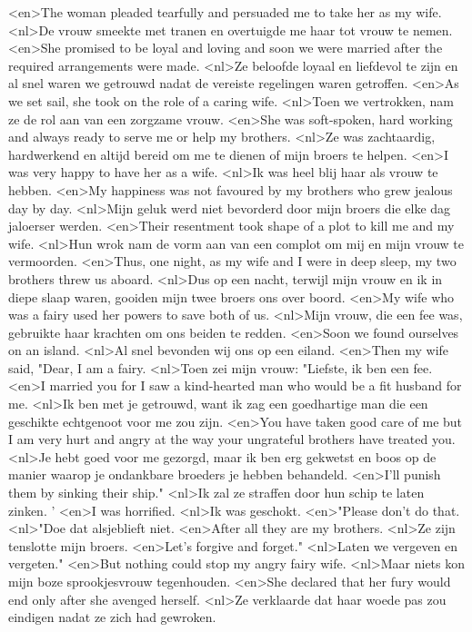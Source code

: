 <en>The woman pleaded tearfully and persuaded me to take her as my wife.
<nl>De vrouw smeekte met tranen en overtuigde me haar tot vrouw te nemen.
<en>She promised to be loyal and loving and soon we were married after the required arrangements were made.
<nl>Ze beloofde loyaal en liefdevol te zijn en al snel waren we getrouwd nadat de vereiste regelingen waren getroffen.
<en>As we set sail, she took on the role of a caring wife.
<nl>Toen we vertrokken, nam ze de rol aan van een zorgzame vrouw.
<en>She was soft-spoken, hard working and always ready to serve me or help my brothers.
<nl>Ze was zachtaardig, hardwerkend en altijd bereid om me te dienen of mijn broers te helpen.
<en>I was very happy to have her as a wife.
<nl>Ik was heel blij haar als vrouw te hebben.
<en>My happiness was not favoured by my brothers who grew jealous day by day.
<nl>Mijn geluk werd niet bevorderd door mijn broers die elke dag jaloerser werden.
<en>Their resentment took shape of a plot to kill me and my wife.
<nl>Hun wrok nam de vorm aan van een complot om mij en mijn vrouw te vermoorden.
<en>Thus, one night, as my wife and I were in deep sleep, my two brothers threw us aboard.
<nl>Dus op een nacht, terwijl mijn vrouw en ik in diepe slaap waren, gooiden mijn twee broers ons over boord.
<en>My wife who was a fairy used her powers to save both of us.
<nl>Mijn vrouw, die een fee was, gebruikte haar krachten om ons beiden te redden.
<en>Soon we found ourselves on an island.
<nl>Al snel bevonden wij ons op een eiland.
<en>Then my wife said, "Dear, I am a fairy.
<nl>Toen zei mijn vrouw: "Liefste, ik ben een fee.
<en>I married you for I saw a kind-hearted man who would be a fit husband for me.
<nl>Ik ben met je getrouwd, want ik zag een goedhartige man die een geschikte echtgenoot voor me zou zijn.
<en>You have taken good care of me but I am very hurt and angry at the way your ungrateful brothers have treated you.
<nl>Je hebt goed voor me gezorgd, maar ik ben erg gekwetst en boos op de manier waarop je ondankbare broeders je hebben behandeld.
<en>I'll punish them by sinking their ship."
<nl>Ik zal ze straffen door hun schip te laten zinken. '
<en>I was horrified.
<nl>Ik was geschokt.
<en>"Please don't do that.
<nl>"Doe dat alsjeblieft niet.
<en>After all they are my brothers.
<nl>Ze zijn tenslotte mijn broers.
<en>Let's forgive and forget."
<nl>Laten we vergeven en vergeten."
<en>But nothing could stop my angry fairy wife.
<nl>Maar niets kon mijn boze sprookjesvrouw tegenhouden.
<en>She declared that her fury would end only after she avenged herself.
<nl>Ze verklaarde dat haar woede pas zou eindigen nadat ze zich had gewroken.
